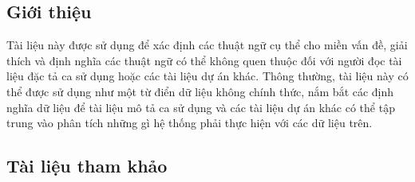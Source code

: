 \documentclass[./../main_file.tex]{subfiles}
\begin{document}
	\subsection{Giới thiệu}
	Tài liệu này được sử dụng để xác định các thuật ngữ cụ thể cho miền vấn đề, giải thích và định nghĩa các thuật ngữ có thể không quen thuộc đối với người đọc tài liệu đặc tả ca sử dụng hoặc các tài liệu dự án khác. Thông thường, tài liệu này có thể được sử dụng như một từ điển dữ liệu không chính thức, nắm bắt các định nghĩa dữ liệu để tài liệu mô tả ca sử dụng và các tài liệu dự án khác có thể tập trung vào phân tích những gì hệ thống phải thực hiện với các dữ liệu trên.
	
	\subsection{Tài liệu tham khảo}
	\nocite{*}
	\printbibliography[heading=none]
	
	\clearpage
	
\end{document}

